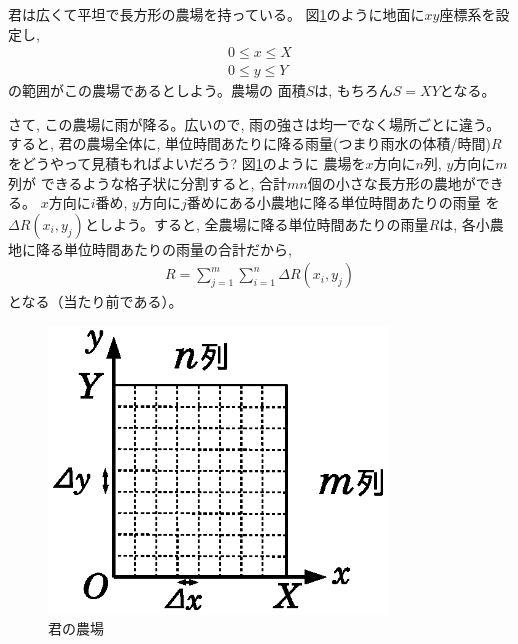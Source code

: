 \begin{exmpl}君は広くて平坦で長方形の農場を持っている。
図\ref{fig:farm}のように地面に$xy$座標系を設定し, 
\begin{eqnarray*}
0\le x\le X\\
0\le y\le Y
\end{eqnarray*}
の範囲がこの農場であるとしよう。農場の
面積$S$は, もちろん$S=XY$となる。

さて, この農場に雨が降る。広いので, 雨の強さは均一でなく場所ごとに違う。
すると, 君の農場全体に, 単位時間あたりに降る雨量(つまり雨水の体積/時間)$R$
をどうやって見積もればよいだろう? 図\ref{fig:farm}のように
農場を$x$方向に$n$列, $y$方向に$m$列が
できるような格子状に分割すると, 合計$mn$個の小さな長方形の農地ができる。
$x$方向に$i$番め, $y$方向に$j$番めにある小農地に降る単位時間あたりの雨量
を$\Delta R(x_i, y_j)$としよう。すると, 全農場に降る単位時間あたりの雨量$R$は, 
各小農地に降る単位時間あたりの雨量の合計だから, 
\begin{eqnarray}
R=\sum_{j=1}^{m}\sum_{i=1}^{n}\Delta R(x_i, y_j)\label{eq:farm0}
\end{eqnarray}
となる（当たり前である）。

\begin{figure}[h]
    \centering
    \includegraphics[width=9cm]{farm.eps}
    \caption{君の農場}
\label{fig:farm}
\end{figure}


\end{exmpl}
